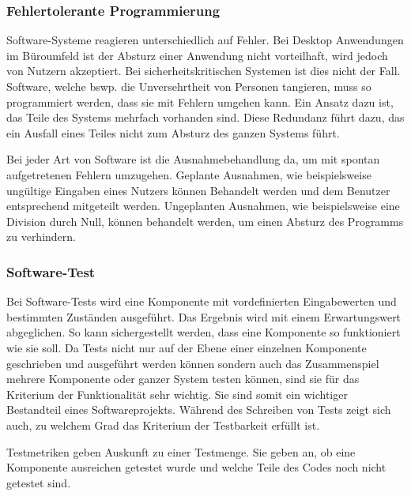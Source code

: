 \subsubsection{Fehlertolerante Programmierung}
Software-Systeme reagieren unterschiedlich auf Fehler.
Bei Desktop Anwendungen im Büroumfeld ist der Absturz einer Anwendung nicht vorteilhaft, wird jedoch von Nutzern akzeptiert.
Bei sicherheitskritischen Systemen ist dies nicht der Fall.
Software, welche bswp. die Unversehrtheit von Personen tangieren, muss so programmiert werden, dass sie mit Fehlern umgehen kann.
Ein Ansatz dazu ist, das Teile des Systems mehrfach vorhanden sind.
Diese Redundanz führt dazu, das ein Ausfall eines Teiles nicht zum Absturz des ganzen Systems führt.

Bei jeder Art von Software ist die Ausnahmebehandlung da, um mit spontan aufgetretenen Fehlern umzugehen.
Geplante Ausnahmen, wie beispielsweise ungültige Eingaben eines Nutzers können Behandelt werden und dem Benutzer entsprechend mitgeteilt werden.
Ungeplanten Ausnahmen, wie beispielsweise eine Division durch Null, können behandelt werden, um einen Absturz des Programms zu verhindern.


\subsubsection{Software-Test}
Bei Software-Tests wird eine Komponente mit vordefinierten Eingabewerten und bestimmten Zuständen ausgeführt.
Das Ergebnis wird mit einem Erwartungswert abgeglichen.
So kann sichergestellt werden, dass eine Komponente so funktioniert wie sie soll.
Da Tests nicht nur auf der Ebene einer einzelnen Komponente geschrieben und ausgeführt werden können sondern auch das Zusammenspiel mehrere Komponente oder ganzer System testen können,
sind sie für das Kriterium der Funktionalität sehr wichtig.
Sie sind somit ein wichtiger Bestandteil eines Softwareprojekts.
Während des Schreiben von Tests zeigt sich auch, zu welchem Grad das Kriterium der Testbarkeit erfüllt ist.

Testmetriken geben Auskunft zu einer Testmenge.
Sie geben an, ob eine Komponente ausreichen getestet wurde und welche Teile des Codes noch nicht getestet sind.

